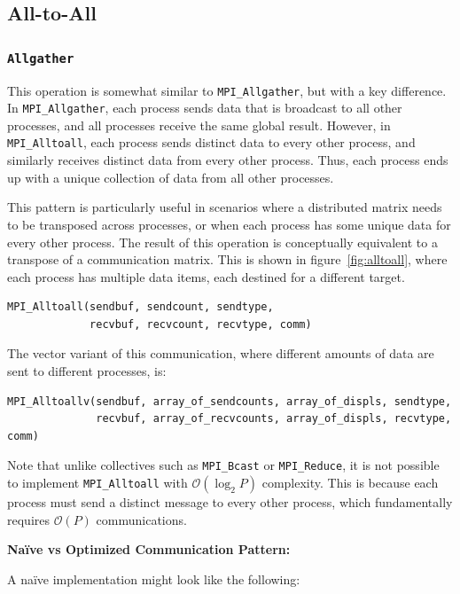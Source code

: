 \documentclass[12pt]{book}
\begin{document}
\subsection{All-to-All}
\subsubsection*{\texttt{Allgather}}
This operation is somewhat similar to \texttt{MPI\_Allgather}, but with a key difference. In \texttt{MPI\_Allgather}, each process sends data that is broadcast to all other processes, and all processes receive the same global result. However, in \texttt{MPI\_Alltoall}, each process sends distinct data to every other process, and similarly receives distinct data from every other process. Thus, each process ends up with a unique collection of data from all other processes.

This pattern is particularly useful in scenarios where a distributed matrix needs to be transposed across processes, or when each process has some unique data for every other process. The result of this operation is conceptually equivalent to a transpose of a communication matrix. This is shown in figure~\ref{fig:alltoall}, where each process has multiple data items, each destined for a different target.

\begin{lstlisting}[style=cppstyle]
MPI_Alltoall(sendbuf, sendcount, sendtype,
             recvbuf, recvcount, recvtype, comm)
\end{lstlisting}

The vector variant of this communication, where different amounts of data are sent to different processes, is:

\begin{lstlisting}[style=cppstyle]
MPI_Alltoallv(sendbuf, array_of_sendcounts, array_of_displs, sendtype,
              recvbuf, array_of_recvcounts, array_of_displs, recvtype, comm)
\end{lstlisting}

Note that unlike collectives such as \texttt{MPI\_Bcast} or \texttt{MPI\_Reduce}, it is not possible to implement \texttt{MPI\_Alltoall} with $\mathcal{O}(\log_2 P)$ complexity. This is because each process must send a distinct message to every other process, which fundamentally requires $\mathcal{O}(P)$ communications.

\vspace{1em}
\textbf{Naïve vs Optimized Communication Pattern:}

A naïve implementation might look like the following:
\end{document}
